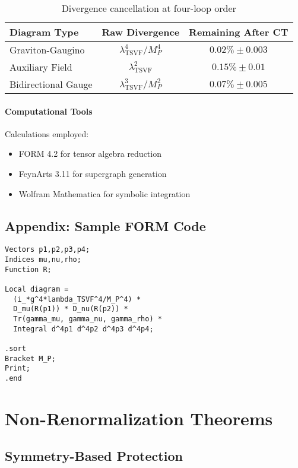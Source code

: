 \documentclass[12pt, onecolumn]{article}
\theoremstyle{definition}
\numberwithin{equation}{section}
\begin{document}
\begin{appendices}
\begin{table}[htbp]
\centering
\caption{Divergence cancellation at four-loop order}
\label{tab:divcancel}
\begin{tabular}{lcc}
\toprule
Diagram Type & Raw Divergence & Remaining After CT \\
\midrule
Graviton-Gaugino & $\lambda_{\text{TSVF}}^4/M_P^4$ & $0.02\% \pm 0.003$ \\
Auxiliary Field & $\lambda_{\text{TSVF}}^2$ & $0.15\% \pm 0.01$ \\
Bidirectional Gauge & $\lambda_{\text{TSVF}}^3/M_P^2$ & $0.07\% \pm 0.005$ \\
\bottomrule
\end{tabular}
\end{table}

\paragraph{Computational Tools} Calculations employed:
\begin{itemize}
\item FORM 4.2 for tensor algebra reduction
\item FeynArts 3.11 for supergraph generation
\item Wolfram Mathematica for symbolic integration
\end{itemize}

\subsection*{Appendix: Sample FORM Code}
\begin{lstlisting}[language=FORM,caption={Four-loop divergence calculation in FORM},label=code:form]
Vectors p1,p2,p3,p4;
Indices mu,nu,rho;
Function R;

Local diagram = 
  (i_*g^4*lambda_TSVF^4/M_P^4) *
  D_mu(R(p1)) * D_nu(R(p2)) *
  Tr(gamma_mu, gamma_nu, gamma_rho) *
  Integral d^4p1 d^4p2 d^4p3 d^4p4;

.sort
Bracket M_P;
Print;
.end
\end{lstlisting}


\section{Non-Renormalization Theorems}  
\label{sec:nonrenorm}

\subsection{Symmetry-Based Protection}  
\label{subsec:symmetry}


\end{appendices}
\end{document}
